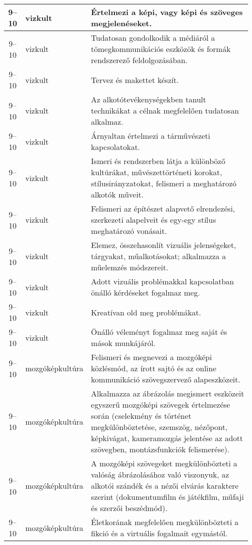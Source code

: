 \begin{small}
\begin{longtable}{c | p{2cm} |  p{11cm} }
              9--10 & vizkult & Értelmezi a képi, vagy képi és szöveges megjelenéseket. \\ \hline
              9--10 & vizkult & Tudatosan gondolkodik a médiáról a tömegkommunikációs eszközök és formák rendszerező feldolgozásában. \\ \hline
              9--10 & vizkult & Tervez és makettet készít. \\ \hline
              9--10 & vizkult & Az alkotótevékenységekben tanult technikákat a célnak megfelelően tudatosan alkalmaz. \\ \hline
              9--10 & vizkult & Árnyaltan értelmezi a tárművészeti kapcsolatokat. \\ \hline
              9--10 & vizkult & Ismeri és rendszerben látja a különböző kultúrákat, művészettörténeti korokat, stílusirányzatokat, felismeri a meghatározó alkotók műveit. \\ \hline
              9--10 & vizkult & Felismeri az építészet alapvető elrendezési, szerkezeti alapelveit és egy-egy stílus meghatározó vonásait. \\ \hline
              9--10 & vizkult & Elemez, összehasonlít vizuális jelenségeket, tárgyakat, műalkotásokat; alkalmazza a műelemzés módszereit. \\ \hline
              9--10 & vizkult & Adott vizuális problémakkal kapcsolatban önálló kérdéseket fogalmaz meg. \\ \hline
              9--10 & vizkult & Kreatívan old meg problémákat. \\ \hline
              9--10 & vizkult & Önálló véleményt fogalmaz meg saját és mások munkájáról. \\ \hline
              9--10 & mozgóképkultúra & Felismeri és megnevezi a mozgóképi közlésmód, az írott sajtó és az online kommunikáció szövegszervező alapeszközeit. \\ \hline
              9--10 & mozgóképkultúra & Alkalmazza az ábrázolás megismert eszközeit egyszerű mozgóképi szövegek értelmezése során (cselekmény és történet megkülönböztetése, szemszög, nézőpont, képkivágat, kameramozgás jelentése az adott szövegben, montázsfunkciók felismerése). \\ \hline
              9--10 & mozgóképkultúra & A mozgóképi szövegeket megkülönbözteti a valóság ábrázolásához való viszonyuk, az alkotói szándék és a nézői elvárás karaktere szerint (dokumentumfilm és játékfilm, műfaji és szerzői beszédmód). \\ \hline
              9--10 & mozgóképkultúra & Életkorának megfelelően megkülönbözteti a fikció és a virtuális fogalmait egymástól.  \\ \hline

\end{longtable}
\end{small}
